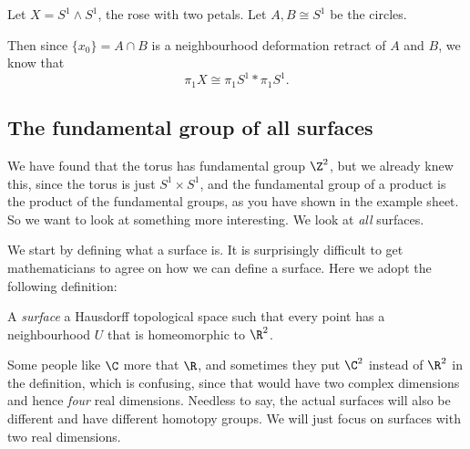 \documentclass[a4paper]{article}
\begin{document}
\begin{eg}
  Let $X = S^1 \wedge S^1$, the rose with two petals. Let $A, B\cong S^1$ be the circles.
  \begin{center}
  \end{center}
  Then since $\{x_0\} = A \cap B$ is a neighbourhood deformation retract of $A$ and $B$, we know that
  \[
    \pi_1 X \cong \pi_1 S^1 * \pi_1S^1.
  \]
\end{eg}
\subsection{The fundamental group of all surfaces}
We have found that the torus has fundamental group $\Z^2$, but we already knew this, since the torus is just $S^1 \times S^1$, and the fundamental group of a product is the product of the fundamental groups, as you have shown in the example sheet. So we want to look at something more interesting. We look at \emph{all} surfaces.

We start by defining what a surface is. It is surprisingly difficult to get mathematicians to agree on how we can define a surface. Here we adopt the following definition:
\begin{defi}[Surface]
  A \emph{surface} a Hausdorff topological space such that every point has a neighbourhood $U$ that is homeomorphic to $\R^2$.
\end{defi}
Some people like $\C$ more that $\R$, and sometimes they put $\C^2$ instead of $\R^2$ in the definition, which is confusing, since that would have two complex dimensions and hence \emph{four} real dimensions. Needless to say, the actual surfaces will also be different and have different homotopy groups. We will just focus on surfaces with two real dimensions.
\end{document}
